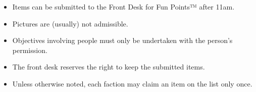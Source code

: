 \begin{itemize}[leftmargin=*, itemsep=-0.7\baselineskip]
\item Items can be submitted to the Front Desk for Fun Points™ after 11am.
\item Pictures are (usually) not admissible.
\item Objectives involving people must only be undertaken with the
  person’s permission.
\item The front desk reserves the right to keep the submitted items.
\item Unless otherwise noted, each faction may claim an item on the
  list only once.
\end{itemize}

